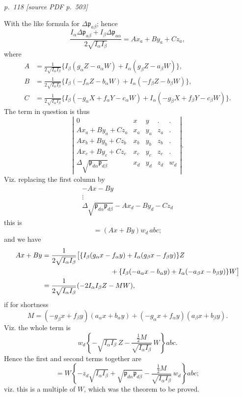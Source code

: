 \documentclass[11pt,a4paper]{article}
\newcommand{\sourcepage}[2]{%
  \bigskip
  \noindent\textit{p.~#1 [source PDF p.~#2]}%
  \par\smallskip
}
\newcommand{\p}{\mathfrak p}
\newcommand{\surf}[1]{\par\smallskip\noindent{\itshape \{Surface $#1$.\}}\par\smallskip}
\begin{document}
\sourcepage{118}{503}
With the like formula for $\Delta\p_{a\beta}$; hence
\[
\frac{I_\alpha\Delta\p_{a\beta}+I_\beta\Delta\p_{a\alpha}}
       {2\sqrt{I_\alpha I_\beta}}
=Ax_a+By_a+Cz_a,
\]
where
\[
\begin{aligned}
A&=\frac{1}{2\sqrt{I_\alpha I_\beta}}
\{I_\beta(g_\alpha Z-a_\alpha W)+I_\alpha(g_\beta Z-a_\beta W)\},\\
B&=\frac{1}{2\sqrt{I_\alpha I_\beta}}
\{I_\beta(-f_\alpha Z-b_\alpha W)+I_\alpha(-f_\beta Z-b_\beta W)\},\\
C&=\frac{1}{2\sqrt{I_\alpha I_\beta}}
\{I_\beta(-g_\alpha X+f_\alpha Y-c_\alpha W)
  +I_\alpha(-g_\beta X+f_\beta Y-c_\beta W)\}.
\end{aligned}
\]
The term in question is thus
\[
\left|\begin{array}{ccccc}
0&x&y&.&.\\
Ax_a+By_a+Cz_a&x_a&y_a&z_a&.\\
Ax_b+By_b+Cz_b&x_b&y_b&z_b&.\\
Ax_c+By_c+Cz_c&x_c&y_c&z_c&.\\
\Delta\sqrt{\p_{d\alpha}\p_{d\beta}}&x_d&y_d&z_d&w_d
\end{array}\right|.
\]
Viz. replacing the first column by
\[
\begin{array}{c}
-Ax-By\\
\vdots\\
\Delta\sqrt{\p_{d\alpha}\p_{d\beta}}-Ax_d-By_d-Cz_d
\end{array}
\]
this is
\[
=(Ax+By)w_d\,abc;
\]
and we have
\[
\begin{aligned}
Ax+By
&=\frac{1}{2\sqrt{I_\alpha I_\beta}}
 \bigl[
 \{I_\beta(g_\alpha x-f_\alpha y)+I_\alpha(g_\beta x-f_\beta y)\}Z\\
&\hspace{35mm}
 +\{I_\beta(-a_\alpha x-b_\alpha y)
    +I_\alpha(-a_\beta x-b_\beta y)\}W
 \bigr]\\
&=\frac{1}{2\sqrt{I_\alpha I_\beta}}(-2I_\alpha I_\beta Z-MW),
\end{aligned}
\]
if for shortness
\[
M=(-g_\beta x+f_\beta y)(a_\alpha x+b_\alpha y)
  +(-g_\alpha x+f_\alpha y)(a_\beta x+b_\beta y).
\]
Viz. the whole term is
\[
w_d\left\{-\sqrt{I_\alpha I_\beta}\,Z
-\frac{\tfrac12 M}{\sqrt{I_\alpha I_\beta}}\,W\right\}abc.
\]
Hence the first and second terms together are
\[
=W\left\{-z_d\sqrt{I_\alpha I_\beta}
  +\sqrt{\p_{d\alpha}\p_{d\beta}}
  -\frac{\tfrac12 M}{\sqrt{I_\alpha I_\beta}}\,w_d\right\}abc;
\]
viz. this is a multiple of $W$, which was the theorem to be proved.
\surf{abcd\alpha\beta}
\end{document}
